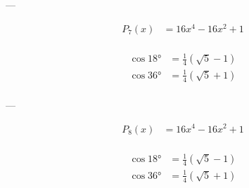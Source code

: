 ---

$$
\begin{aligned}
    P_{7}(x) &= 16 x^4-16 x^2+1\\
\end{aligned}
$$

$$
\begin{aligned}
    \cos 18° &= \frac{1}{4} \left(\sqrt{5}-1\right)\\
    \cos 36° &= \frac{1}{4} \left(\sqrt{5}+1\right)\\
\end{aligned}
$$

---

$$
\begin{aligned}
    P_{8}(x) &= 16 x^4-16 x^2+1\\
\end{aligned}
$$

$$
\begin{aligned}
    \cos 18° &= \frac{1}{4} \left(\sqrt{5}-1\right)\\
    \cos 36° &= \frac{1}{4} \left(\sqrt{5}+1\right)\\
\end{aligned}
$$